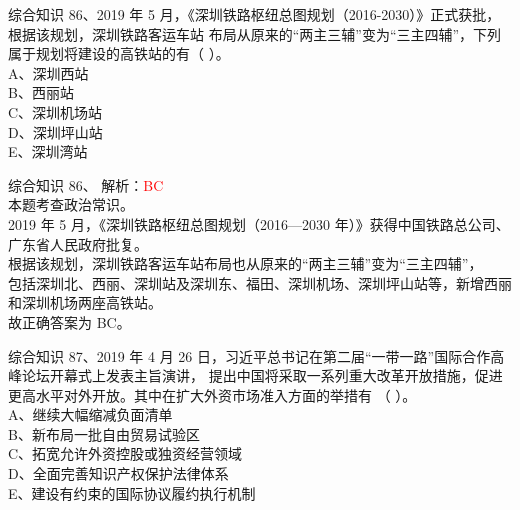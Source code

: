 \documentclass[aspectratio=169]{beamer}
\begin{document}
\begin{frame}[t]{综合知识}
    86、2019 年 5 月，《深圳铁路枢纽总图规划（2016-2030）》正式获批，根据该规划，深圳铁路客运车站
    布局从原来的“两主三辅”变为“三主四辅”，下列属于规划将建设的高铁站的有（ ）。\\
    A、深圳西站                                                                \\
    B、西丽站                                                                  \\
    C、深圳机场站                                                              \\
    D、深圳坪山站                                                              \\
    E、深圳湾站                                                                \\
\end{frame}                           

\begin{frame}[t]{综合知识}
    86、  解析：\textcolor{red}{BC}\\
    本题考查政治常识。\\
    2019 年 5 月，《深圳铁路枢纽总图规划（2016—2030 年）》获得中国铁路总公司、广东省人民政府批复。\\
    根据该规划，深圳铁路客运车站布局也从原来的“两主三辅”变为“三主四辅”，\\
    包括深圳北、西丽、深圳站及深圳东、福田、深圳机场、深圳坪山站等，新增西丽和深圳机场两座高铁站。\\
    故正确答案为 BC。\\
\end{frame}                           





\begin{frame}[t]{综合知识}
    87、2019 年 4 月 26 日，习近平总书记在第二届“一带一路”国际合作高峰论坛开幕式上发表主旨演讲，
    提出中国将采取一系列重大改革开放措施，促进更高水平对外开放。其中在扩大外资市场准入方面的举措有
    （ ）。                                              \\
    A、继续大幅缩减负面清单                              \\
    B、新布局一批自由贸易试验区                          \\
    C、拓宽允许外资控股或独资经营领域                    \\
    D、全面完善知识产权保护法律体系                      \\
    E、建设有约束的国际协议履约执行机制                  \\
\end{frame}                           
\end{document}
